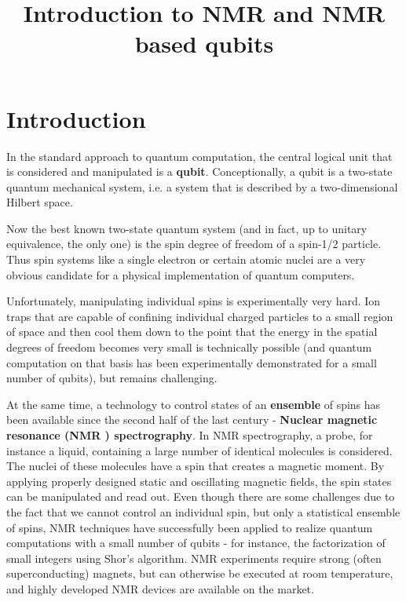 \documentclass[a4paper, draft]{article}
\title{Introduction to NMR and NMR based qubits}
\theoremstyle{own}
\theoremstyle{remark}
\begin{document}
\maketitle

\section{Introduction}

In the standard approach to quantum computation, the central logical unit that is considered and manipulated is a {\bf qubit}. Conceptionally, a qubit is a two-state quantum mechanical system, i.e. a system that is described by a two-dimensional Hilbert space. 

Now the best known two-state quantum system (and in fact, up to unitary equivalence, the only one) is the spin degree of freedom of a spin-1/2 particle. Thus spin systems like a single electron or certain atomic nuclei are a very obvious candidate for a physical implementation of quantum computers.

Unfortunately, manipulating individual spins is experimentally very hard. Ion traps that are capable of confining individual charged particles to a small region of space and then cool them down to the point that the energy in the spatial degrees of freedom becomes very small is technically possible (and quantum computation on that basis has been experimentally demonstrated for a small number of qubits), but remains challenging.

At the same time, a technology to control states of an {\bf ensemble} of spins has been available since the second half of the last century - {\bf Nuclear magnetic resonance (NMR ) spectrography}. In NMR spectrography, a probe, for instance a liquid, containing a large number of identical molecules is considered. The nuclei of these molecules have a spin that creates a magnetic moment. By applying properly designed static and oscillating magnetic fields, the spin states can be manipulated and read out. Even though there are some challenges due to the fact that we cannot control an individual spin, but only a statistical ensemble of spins, NMR techniques have successfully been applied to realize quantum computations with a small number of qubits - for instance, the factorization of small integers using Shor's algorithm. NMR experiments require strong (often superconducting) magnets, but can otherwise be executed at room temperature, and highly developed NMR devices are available on the market.
\end{document}
